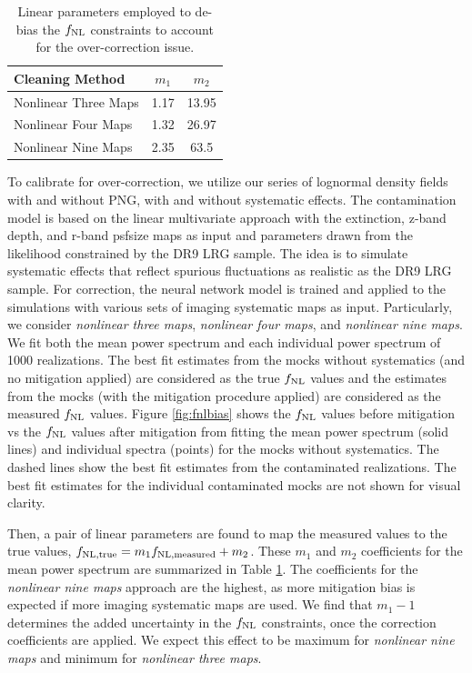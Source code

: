 \begin{table}
\begin{center}
\caption{Linear parameters employed to de-bias the $f_{\rm NL}$ constraints to account for the over-correction issue.}\label{tab:debiasparams}
\begin{tabular}{lcc}
\hline
\hline
\textbf{Cleaning Method} & $m_{1}$ & $m_{2}$ \\
\hline
Nonlinear Three Maps & 1.17 & 13.95 \\
Nonlinear Four Maps & 1.32 & 26.97 \\
Nonlinear Nine Maps & 2.35 & 63.5\\
\hline
\end{tabular}
\end{center}
\end{table}


To calibrate for over-correction, we utilize our series of lognormal density fields with and without PNG, with and without systematic effects. The contamination model is based on the linear multivariate approach with the extinction, z-band depth, and r-band psfsize maps as input and parameters drawn from the likelihood constrained by the DR9 LRG sample. The idea is to simulate systematic effects that reflect spurious fluctuations as  realistic as the DR9 LRG sample. For correction, the neural network model is trained and applied to the simulations with various sets of imaging systematic maps as input. Particularly, we consider \textit{nonlinear three maps}, \textit{nonlinear four maps}, and \textit{nonlinear nine maps}. We fit both the mean power spectrum and each individual power spectrum of 1000 realizations. The best fit estimates from the mocks without systematics (and no mitigation applied) are considered as the true $f_{\rm NL}$ values and the estimates from the mocks (with the mitigation procedure applied) are considered as the measured $f_{\rm NL}$ values. Figure \ref{fig:fnlbias} shows the $f_{\rm NL}$ values before mitigation vs the $f_{\rm NL}$ values after mitigation  from fitting the mean power spectrum (solid lines) and individual spectra (points) for the mocks without systematics. The dashed lines show the best fit estimates from the contaminated realizations. The best fit estimates for the individual contaminated mocks are not shown for visual clarity. 

Then, a pair of linear parameters are found to map the measured values to the true values, $f_{\rm NL, true} = m_{1} f_{\rm NL, measured} + m_{2}$. These $m_{1}$ and $m_{2}$ coefficients for the mean power spectrum are summarized in Table \ref{tab:debiasparams}. The coefficients for the \textit{nonlinear nine maps} approach are the highest, as more mitigation bias is expected if more imaging systematic maps are used. We find that $m_{1}-1$ determines the added uncertainty in the $f_{\rm NL}$ constraints, once the correction coefficients are applied. We expect this effect to be maximum for \textit{nonlinear nine maps} and minimum for \textit{nonlinear three maps}. 

